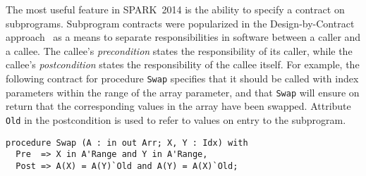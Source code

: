 \documentclass[10pt,a4paper,twocolumn]{article}
\newcommand{\newspark}{SPARK~2014\xspace}
\begin{document}
The most useful feature in \newspark is the ability to specify a
contract on subprograms. Subprogram contracts were popularized in the
Design-by-Contract approach~\cite{meyer:1988:OSC} as a means to
separate responsibilities in software between a caller and a
callee. The callee's \textit{precondition} states the responsibility
of its caller, while the callee's \textit{postcondition} states the
responsibility of the callee itself.  For example, the following
contract for procedure \verb|Swap| specifies that it should be called
with index parameters within the range of the array parameter, and
that \verb|Swap| will ensure on return that the corresponding values
in the array have been swapped. Attribute \verb|Old| in the
postcondition is used to refer to values on entry to the subprogram.

\begin{lstlisting}
procedure Swap (A : in out Arr; X, Y : Idx) with
  Pre  => X in A'Range and Y in A'Range,
  Post => A(X) = A(Y)`Old and A(Y) = A(X)`Old;
\end{lstlisting}



\end{document}
